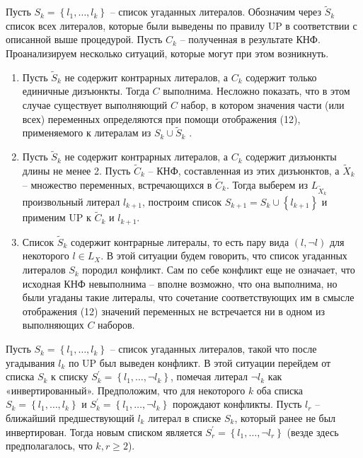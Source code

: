 Пусть $S_{k} = \left\{ l_{1},\ldots,l_{k} \right\}$ -- список угаданных литералов. Обозначим через ${\widetilde{S}}_{k}$ список всех литералов, которые были выведены по правилу UP в соответствии с описанной выше процедурой. Пусть $C_{k}$ -- полученная в результате КНФ. Проанализируем несколько ситуаций, которые могут при этом возникнуть.

\begin{enumerate}
\item
  Пусть ${\widetilde{S}}_{k}$ не содержит контрарных литералов, а $C_{k}$ содержит только единичные дизъюнкты. Тогда $C$ выполнима. Несложно показать, что в этом случае существует выполняющий $C$ набор, в котором значения части (или всех) переменных определяются при помощи отображения (12), применяемого к литералам из $S_{k} \cup {\widetilde{S}}_{k}$ .
\item
  Пусть ${\widetilde{S}}_{k}$ не содержит контрарных литералов, а $C_{k}$ содержит дизъюнкты длины не менее 2. Пусть ${\widetilde{C}}_{k}$ -- КНФ, составленная из этих дизъюнктов, а ${\widetilde{X}}_{k}$ -- множество переменных, встречающихся в ${\widetilde{C}}_{k}$. Тогда выберем из $L_{{\widetilde{X}}_{k}}$ произвольный литерал $l_{k + 1}$, построим список $S_{k + 1} = S_{k} \cup \left\{ l_{k + 1} \right\}$ и применим UP к ${\widetilde{C}}_{k}$ и $l_{k + 1}$.
\item
  Список ${\widetilde{S}}_{k}$ содержит контрарные литералы, то есть пару вида $(l,\neg l)$ для некоторого $l \in L_{X}$. В этой ситуации будем говорить, что список угаданных литералов $S_{k}$ породил конфликт. Сам по себе конфликт еще не означает, что исходная КНФ невыполнима -- вполне возможно, что она выполнима, но были угаданы такие литералы, что сочетание соответствующих им в смысле отображения (12) значений переменных не встречается ни в одном из выполняющих $C$ наборов.
\end{enumerate}

Пусть $S_{k} = \left\{ l_{1},\ldots,l_{k} \right\}$ -- список угаданных литералов, такой что после угадывания $l_{k}$ по UP был выведен конфликт. В этой ситуации перейдем от списка $S_{k}$ к списку $S_{k}^{'} = \left\{ l_{1},\ldots,\neg l_{k} \right\}$, помечая литерал $\neg l_{k}$ как «инвертированный». Предположим, что для некоторого $k$ оба списка $S_{k} = \left\{ l_{1},\ldots,l_{k} \right\}$ и $S_{k}^{'} = \left\{ l_{1},\ldots,{\neg l}_{k} \right\}$ порождают конфликты. Пусть $l_{r}$ -- ближайший предшествующий $l_{k}$ литерал в списке $S_{k}$, который ранее не был инвертирован. Тогда новым списком является $S_{r}^{'} = \left\{ l_{1},\ldots,{\neg l}_{r} \right\}$ (везде здесь предполагалось, что $k,r \geq 2$).

